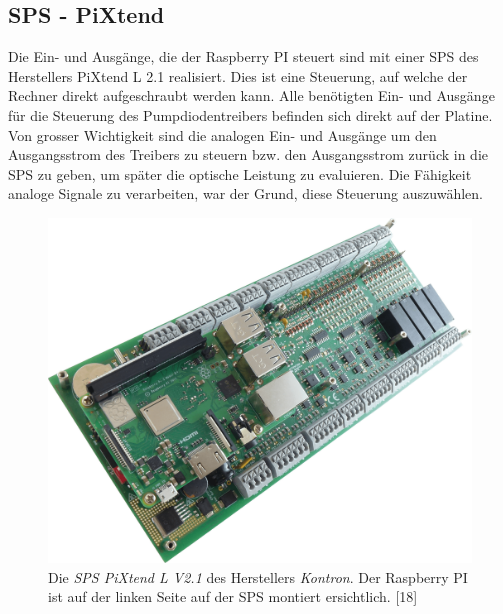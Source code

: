 \subsection{SPS - PiXtend}
Die Ein- und Ausgänge, die der Raspberry PI steuert sind mit einer SPS des Herstellers PiXtend L 2.1 realisiert. Dies ist eine Steuerung, auf welche der Rechner direkt aufgeschraubt werden kann. Alle benötigten Ein- und Ausgänge für die Steuerung des Pumpdiodentreibers befinden sich direkt auf der Platine. Von grosser Wichtigkeit sind die analogen Ein- und Ausgänge um den Ausgangsstrom des Treibers zu steuern bzw. den Ausgangsstrom zurück in die SPS zu geben, um später die optische Leistung zu evaluieren. Die Fähigkeit analoge Signale zu verarbeiten, war der Grund, diese Steuerung auszuwählen.

\begin{figure}[H]
    \centering
    \includegraphics[scale=0.08]{98_images/pixtend_l_basic.png}
    \caption{Die \textit{SPS PiXtend L V2.1} des Herstellers \textit{Kontron}. Der Raspberry PI ist auf der linken Seite auf der SPS montiert ersichtlich. [18]}
    \label{fig:sps_pixtend_hw}
\end{figure}

